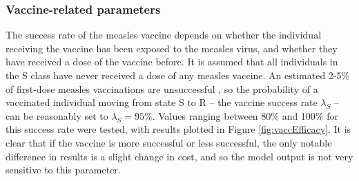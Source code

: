 \subsubsection{Vaccine-related parameters}
The success rate of the measles vaccine depends on whether the individual receiving the vaccine has been exposed to the measles virus, and whether they have received a dose of the vaccine before. It is assumed that all individuals in the S class have never received a dose of any measles vaccine.
An estimated 2-5\% of first-dose measles vaccinations are unsuccessful \cite{cdc_pinkbook_2018}, so the probability of a vaccinated individual moving from state S to R -- the vaccine success rate $\lambda_{S}$ -- can be reasonably set to $\lambda_{S} = 95\%$. Values ranging between 80\% and 100\% for this success rate were tested, with results plotted in Figure \ref{fig:vaccEfficacy}. It is clear that if the vaccine is more successful or less successful, the only notable difference in results is a slight change in cost, and so the model output is not very sensitive to this parameter.

